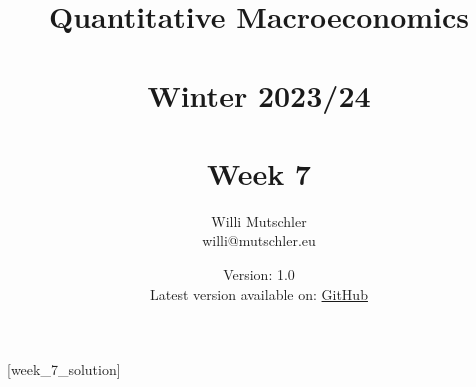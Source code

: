 
\newif\ifDisplaySolutions%


\title{Quantitative Macroeconomics\\~\\Winter 2023/24\\~\\Week 7}
\author{Willi Mutschler\\willi@mutschler.eu}
\date{Version: 1.0\\Latest version available on: \href{https://github.com/wmutschl/Quantitative-Macroeconomics/releases/latest/download/week_7.pdf}{GitHub}}
\maketitle\thispagestyle{empty}

\newpage
{}[week_7_solution]
\tableofcontents\thispagestyle{empty}\newpage

\setcounter{page}{1}
\newpage
\newpage
\newpage
\printbibliography
\newpage

\ifDisplaySolutions
\newpage
\appendix
\section{Solutions}

\fi
